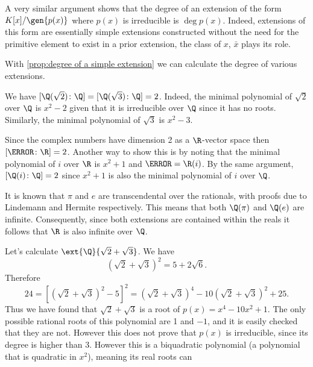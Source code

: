 \documentclass[12pt,oneside]{book}
\begin{document}
A very similar argument shows that the degree of an extension of the form \(
K[x]/\gen{p(x)} \) where \( p(x) \) is irreducible is \( \deg{p(x)} \). Indeed, extensions
of this form are essentially simple extensions constructed without the need for the
primitive element to exist in a prior extension, the class of \( x \), \( \bar{x} \) plays its role.

\begin{example}
	With \cref{prop:degree of a simple extension} we can calculate the degree of various
	extensions.
	\begin{points}
	\item We have \( [\Q(\sqrt{2}) \colon \Q] = [\Q(\sqrt{3}) \colon \Q] = 2 \). Indeed, the
		minimal polynomial of \( \sqrt{2} \) over \( \Q \) is \( x^2 - 2 \) given that it is
		irreducible over \( \Q \) since it has no roots. Similarly, the minimal polynomial of
		\( \sqrt{3} \) is \( x^2 - 3 \).
	\item Since the complex numbers have dimension 2 as a \( \R \)-vector space then \( [\C
		\colon \R ] = 2 \). Another way to show this is by noting that the minimal
		polynomial of \( i \) over \( \R \) is \( x^2 + 1 \) and \( \C = \R(i) \). By the same
		argument, \( [\Q(i) \colon \Q] = 2 \) since \( x^2 + 1 \) is also the minimal
		polynomial of \( i \) over \( \Q \).
	\item It is known that \( \pi \) and \( e \) are transcendental over the rationals, with
		proofs due to Lindemann and Hermite respectively. This means that both \(
		\Q(\pi) \) and \( \Q(e) \) are infinite. Consequently, since both extensions are
		contained within the reals it follows that \( \R \) is also infinite over \( \Q \).
	\item Let's calculate \( \ext{\Q}{\sqrt{2} + \sqrt{3}} \). We have 
		\begin{equation*}
			(\sqrt{2} + \sqrt{3})^2 = 5 + 2 \sqrt{6}.
		\end{equation*}
		Therefore 
		\begin{equation*}
			24 = [(\sqrt{2}+ \sqrt{3})^2 - 5]^2 = (\sqrt{2} + \sqrt{3})^4 - 10(\sqrt{2} +
			\sqrt{3})^2 + 25.
		\end{equation*}
		Thus we have found that \( \sqrt{2} + \sqrt{3} \) is a root of \( p(x) = x^4 - 10 x^2 +1 \).
		The only possible rational roots of this polynomial are 1 and \( -1 \), and it is
		easily checked that they are not. However this does not prove that \( p(x) \) is
		irreducible, since its degree is higher than 3. However this is a biquadratic
		polynomial (a polynomial that is quadratic in \( x^2 \)), meaning its real roots can

\end{points}
\end{example}
\end{document}
